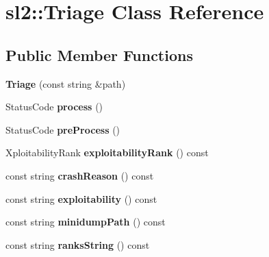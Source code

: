 \hypertarget{classsl2_1_1_triage}{}\section{sl2\+:\+:Triage Class Reference}
\label{classsl2_1_1_triage}
\subsection*{Public Member Functions}
\begin{DoxyCompactItemize}
\item 
\mbox{\label{classsl2_1_1_triage_a365d8058e52e6922f236e866d891ed02}} 
{\bfseries Triage} (const string \&path)
\item 
\mbox{\label{classsl2_1_1_triage_a78036002d0f6e3802dfa9222e8a00839}} 
Status\+Code {\bfseries process} ()
\item 
\mbox{\label{classsl2_1_1_triage_ad8da0dd37528cb50e59a0ffb94534e11}} 
Status\+Code {\bfseries pre\+Process} ()
\item 
\mbox{\label{classsl2_1_1_triage_a91d155dd24490deb19228e8d882b69b9}} 
Xploitability\+Rank {\bfseries exploitability\+Rank} () const
\item 
\mbox{\label{classsl2_1_1_triage_a09a613838973301dff22f10f69e299b6}} 
const string {\bfseries crash\+Reason} () const
\item 
\mbox{\label{classsl2_1_1_triage_a9238f1faa5ba63ff6b44930ab0f20c7b}} 
const string {\bfseries exploitability} () const
\item 
\mbox{\label{classsl2_1_1_triage_a758513f8f56ac0d346f7035525cfe8d3}} 
const string {\bfseries minidump\+Path} () const
\item 
\mbox{\label{classsl2_1_1_triage_a6d207cb455f10a89bac10ab05b8fc2cd}} 
const string {\bfseries ranks\+String} () const
\item 
\mbox{\label{classsl2_1_1_triage_a9e293a7edbe85a446a76fc67763f063d}} 

\end{DoxyCompactItemize}
